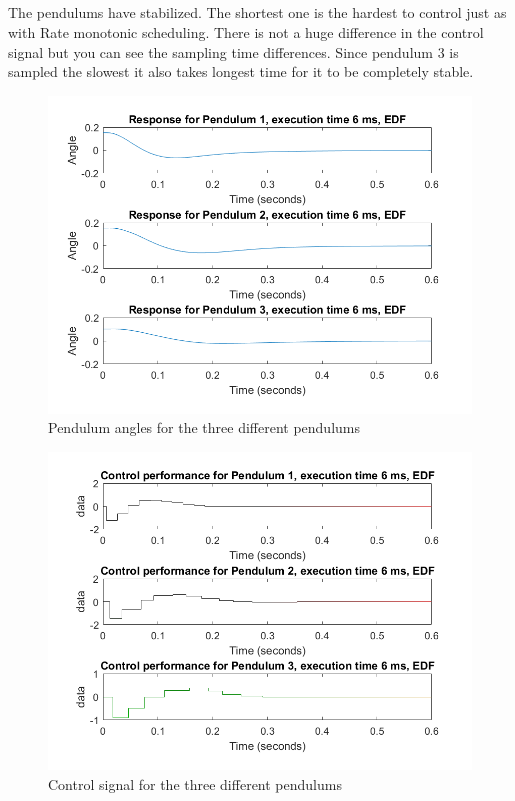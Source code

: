 \documentclass[12pt,a4paper]{article}
\begin{document}
\subsection{} %
The pendulums have stabilized. The shortest one is the hardest to
control just as with Rate monotonic scheduling. There is not a huge
difference in the control signal but you can see the sampling time
differences. Since pendulum 3 is sampled the slowest it also takes
longest time for it to be completely stable.
\begin{center}
	\begin{figure}[H]
      \centering
	\includegraphics[scale=0.5]{ex61.png}
	\caption{Pendulum angles for the three different pendulums}
	\label{fig:ex61}
	\end{figure}
\end{center}
\begin{center}
	\begin{figure}[H]
      \centering
	\includegraphics[scale=0.5]{ex62.png}
	\caption{Control signal  for the three different pendulums}
	\label{fig:ex62}
	\end{figure}
\end{center}
\end{document}

